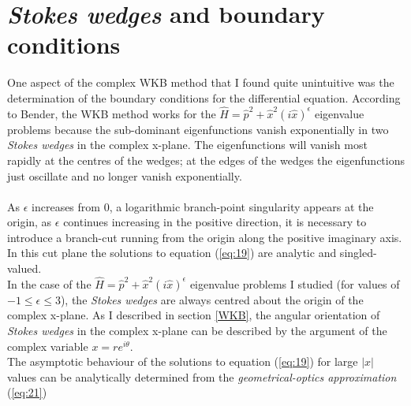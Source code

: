 \documentclass[10pt, a4paper, singlespacing, headsepline]{report}
\begin{document}
\section{\emph{Stokes wedges} and boundary conditions} \label{Boundary conditions}
One aspect of the complex WKB method that I found quite unintuitive was the determination of the boundary conditions for the differential equation. According to Bender, the WKB method works for the $\hat{H} = \hat{p}^2 + \hat{x}^2 (i \hat{x})^{\epsilon}$ eigenvalue problems because the sub-dominant eigenfunctions vanish exponentially in two \emph{Stokes wedges} in the complex x-plane. The eigenfunctions will vanish most rapidly at the centres of the wedges; at the edges of the wedges the eigenfunctions just oscillate and no longer vanish exponentially\cite{BenderPT}.\\\\
As $\epsilon$ increases from 0, a logarithmic branch-point singularity appears at the origin, as $\epsilon$ continues increasing in the positive direction, it is necessary to introduce a branch-cut running from the origin along the positive imaginary axis. In this cut plane the solutions to equation (\ref{eq:19}) are analytic and singled-valued\cite{BenderPT}.\\
In the case of the $\hat{H} = \hat{p}^2 + \hat{x}^2 (i \hat{x})^{\epsilon}$ eigenvalue problems I studied (for values of $-1 \leq \epsilon \leq 3$), the \emph{Stokes wedges} are always centred about the origin of the complex x-plane. As I described in section \ref{WKB}, the angular orientation of \emph{Stokes wedges} in the complex x-plane can be described by the argument of the complex variable $x = re^{i\theta}$.\\
The asymptotic behaviour of the solutions to equation (\ref{eq:19}) for large $|x|$ values can be analytically determined from the \emph{geometrical-optics approximation} (\ref{eq:21})
\end{document}
